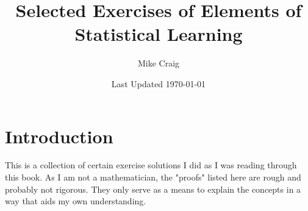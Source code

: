 \documentclass{article}
\theoremstyle{remark}
\begin{document}
\title{Selected Exercises of Elements of Statistical Learning}
\author{Mike Craig}
\date{Last Updated \today}

\maketitle

\section{Introduction}

This is a collection of certain exercise solutions I did as I was reading
through this book. As I am not a mathematician, the "proofs" listed here
are rough and probably not rigorous. They only serve as a means to explain
the concepts in a way that aids my own understanding.


\end{document}
